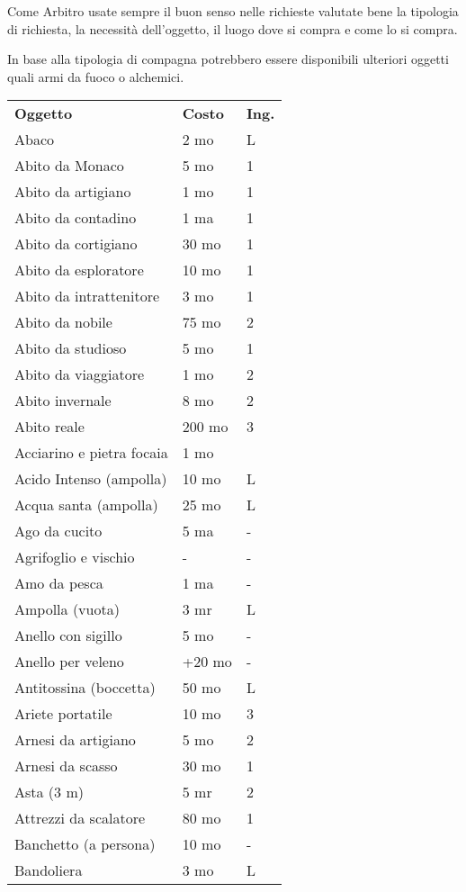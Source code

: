 \documentclass[12pt,a4paper,twoside,openany]{book}
\begin{document}
\begin{multicols}{2}
Come Arbitro usate sempre il buon senso nelle richieste valutate bene la tipologia di richiesta, la necessità dell'oggetto, il luogo dove si compra e come lo si compra.

In base alla tipologia di compagna potrebbero essere disponibili ulteriori oggetti quali armi da fuoco o alchemici.

\medskip

{\small
\begin{tabularx}{0.42\textwidth}{lll}
\textbf{Oggetto}    & \textbf{Costo} & \textbf{Ing.}\\
Abaco&2 mo&L\\
Abito da Monaco & 5 mo& 1\\
Abito da artigiano& 1 mo& 1\\
Abito da contadino& 1 ma& 1\\
Abito da cortigiano& 30 mo  & 1\\
Abito da esploratore  & 10 mo& 1\\
Abito da intrattenitore & 3 mo& 1\\
Abito da nobile & 75 mo  & 2\\
Abito da studioso & 5 mo& 1\\
Abito da viaggiatore  & 1 mo& 2\\
Abito invernale & 8 mo& 2\\
Abito reale & 200 mo & 3\\
Acciarino e pietra focaia & 1 mo&\\
Acido Intenso (ampolla) & 10 mo  & L \\
Acqua santa (ampolla) & 25 mo& L\\
Ago da cucito & 5 ma &- \\
Agrifoglio e vischio  & -  & -\\
Amo da pesca  & 1 ma& - \\
Ampolla (vuota)& 3 mr& L \\
Anello con sigillo  & 5 mo& - \\
Anello per veleno & +20 mo&-\\
Antitossina (boccetta)  & 50 mo  & L\\
Ariete portatile  & 10 mo& 3 \\
Arnesi da artigiano& 5 mo& 2\\
Arnesi da scasso  & 30 mo& 1\\
Asta (3 m)  & 5 mr& 2\\
Attrezzi da scalatore & 80 mo& 1\\
Banchetto (a persona) & 10 mo  & -\\
Bandoliera & 3 mo & L\\

\end{tabularx}}
\end{multicols}
\end{document}
